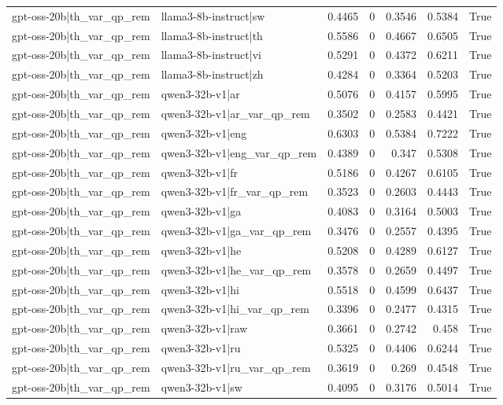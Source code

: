 \begin{table}
\begin{tabular}{l l r r r r l}
gpt-oss-20b|th_var_qp_rem & llama3-8b-instruct|sw & 0.4465 & 0 & 0.3546 & 0.5384 & True \\
gpt-oss-20b|th_var_qp_rem & llama3-8b-instruct|th & 0.5586 & 0 & 0.4667 & 0.6505 & True \\
gpt-oss-20b|th_var_qp_rem & llama3-8b-instruct|vi & 0.5291 & 0 & 0.4372 & 0.6211 & True \\
gpt-oss-20b|th_var_qp_rem & llama3-8b-instruct|zh & 0.4284 & 0 & 0.3364 & 0.5203 & True \\
gpt-oss-20b|th_var_qp_rem & qwen3-32b-v1|ar & 0.5076 & 0 & 0.4157 & 0.5995 & True \\
gpt-oss-20b|th_var_qp_rem & qwen3-32b-v1|ar_var_qp_rem & 0.3502 & 0 & 0.2583 & 0.4421 & True \\
gpt-oss-20b|th_var_qp_rem & qwen3-32b-v1|eng & 0.6303 & 0 & 0.5384 & 0.7222 & True \\
gpt-oss-20b|th_var_qp_rem & qwen3-32b-v1|eng_var_qp_rem & 0.4389 & 0 & 0.347 & 0.5308 & True \\
gpt-oss-20b|th_var_qp_rem & qwen3-32b-v1|fr & 0.5186 & 0 & 0.4267 & 0.6105 & True \\
gpt-oss-20b|th_var_qp_rem & qwen3-32b-v1|fr_var_qp_rem & 0.3523 & 0 & 0.2603 & 0.4443 & True \\
gpt-oss-20b|th_var_qp_rem & qwen3-32b-v1|ga & 0.4083 & 0 & 0.3164 & 0.5003 & True \\
gpt-oss-20b|th_var_qp_rem & qwen3-32b-v1|ga_var_qp_rem & 0.3476 & 0 & 0.2557 & 0.4395 & True \\
gpt-oss-20b|th_var_qp_rem & qwen3-32b-v1|he & 0.5208 & 0 & 0.4289 & 0.6127 & True \\
gpt-oss-20b|th_var_qp_rem & qwen3-32b-v1|he_var_qp_rem & 0.3578 & 0 & 0.2659 & 0.4497 & True \\
gpt-oss-20b|th_var_qp_rem & qwen3-32b-v1|hi & 0.5518 & 0 & 0.4599 & 0.6437 & True \\
gpt-oss-20b|th_var_qp_rem & qwen3-32b-v1|hi_var_qp_rem & 0.3396 & 0 & 0.2477 & 0.4315 & True \\
gpt-oss-20b|th_var_qp_rem & qwen3-32b-v1|raw & 0.3661 & 0 & 0.2742 & 0.458 & True \\
gpt-oss-20b|th_var_qp_rem & qwen3-32b-v1|ru & 0.5325 & 0 & 0.4406 & 0.6244 & True \\
gpt-oss-20b|th_var_qp_rem & qwen3-32b-v1|ru_var_qp_rem & 0.3619 & 0 & 0.269 & 0.4548 & True \\
gpt-oss-20b|th_var_qp_rem & qwen3-32b-v1|sw & 0.4095 & 0 & 0.3176 & 0.5014 & True \\

\end{tabular}
\end{table}
